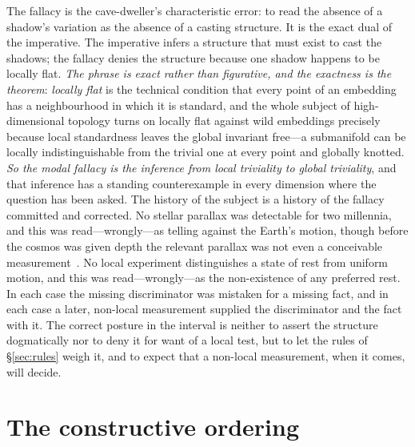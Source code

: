 \documentclass[11pt,a4paper]{article}
\begin{document}
\noindent The fallacy is the cave-dweller's characteristic error: to read the absence of a shadow's variation as the absence of a casting structure. It is the exact dual of the imperative. The imperative infers a structure that must exist to cast the shadows; the fallacy denies the structure because one shadow happens to be locally flat. \emph{The phrase is exact rather than figurative, and the exactness is the theorem}: \emph{locally flat} is the technical condition that every point of an embedding has a neighbourhood in which it is standard, and the whole subject of high-dimensional topology turns on locally flat against wild embeddings precisely because local standardness leaves the global invariant free---a submanifold can be locally indistinguishable from the trivial one at every point and globally knotted. \emph{So the modal fallacy is the inference from local triviality to global triviality}, and that inference has a standing counterexample in every dimension where the question has been asked. The history of the subject is a history of the fallacy committed and corrected. No stellar parallax was detectable for two millennia, and this was read---wrongly---as telling against the Earth's motion, though before the cosmos was given depth the relevant parallax was not even a conceivable measurement~\cite{JanzenSettingRecord}. No local experiment distinguishes a state of rest from uniform motion, and this was read---wrongly---as the non-existence of any preferred rest. In each case the missing discriminator was mistaken for a missing fact, and in each case a later, non-local measurement supplied the discriminator and the fact with it. The correct posture in the interval is neither to assert the structure dogmatically nor to deny it for want of a local test, but to let the rules of \S\ref{sec:rules} weigh it, and to expect that a non-local measurement, when it comes, will decide.

\section{The constructive ordering}\label{sec:ordering}
\end{document}
